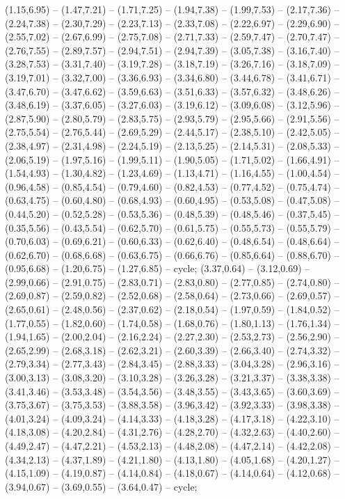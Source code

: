 { (1.15,6.95) -- (1.47,7.21) -- (1.71,7.25) -- (1.94,7.38) -- (1.99,7.53) -- (2.17,7.36) -- (2.24,7.38) -- (2.30,7.29) -- (2.23,7.13) -- (2.33,7.08) -- (2.22,6.97) -- (2.29,6.90) -- (2.55,7.02) -- (2.67,6.99) -- (2.75,7.08) -- (2.71,7.33) -- (2.59,7.47) -- (2.70,7.47) -- (2.76,7.55) -- (2.89,7.57) -- (2.94,7.51) -- (2.94,7.39) -- (3.05,7.38) -- (3.16,7.40) -- (3.28,7.53) -- (3.31,7.40) -- (3.19,7.28) -- (3.18,7.19) -- (3.26,7.16) -- (3.18,7.09) -- (3.19,7.01) -- (3.32,7.00) -- (3.36,6.93) -- (3.34,6.80) -- (3.44,6.78) -- (3.41,6.71) -- (3.47,6.70) -- (3.47,6.62) -- (3.59,6.63) -- (3.51,6.33) -- (3.57,6.32) -- (3.48,6.26) -- (3.48,6.19) -- (3.37,6.05) -- (3.27,6.03) -- (3.19,6.12) -- (3.09,6.08) -- (3.12,5.96) -- (2.87,5.90) -- (2.80,5.79) -- (2.83,5.75) -- (2.93,5.79) -- (2.95,5.66) -- (2.91,5.56) -- (2.75,5.54) -- (2.76,5.44) -- (2.69,5.29) -- (2.44,5.17) -- (2.38,5.10) -- (2.42,5.05) -- (2.38,4.97) -- (2.31,4.98) -- (2.24,5.19) -- (2.13,5.25) -- (2.14,5.31) -- (2.08,5.33) -- (2.06,5.19) -- (1.97,5.16) -- (1.99,5.11) -- (1.90,5.05) -- (1.71,5.02) -- (1.66,4.91) -- (1.54,4.93) -- (1.30,4.82) -- (1.23,4.69) -- (1.13,4.71) -- (1.16,4.55) -- (1.00,4.54) -- (0.96,4.58) -- (0.85,4.54) -- (0.79,4.60) -- (0.82,4.53) -- (0.77,4.52) -- (0.75,4.74) -- (0.63,4.75) -- (0.60,4.80) -- (0.68,4.93) -- (0.60,4.95) -- (0.53,5.08) -- (0.47,5.08) -- (0.44,5.20) -- (0.52,5.28) -- (0.53,5.36) -- (0.48,5.39) -- (0.48,5.46) -- (0.37,5.45) -- (0.35,5.56) -- (0.43,5.54) -- (0.62,5.70) -- (0.61,5.75) -- (0.55,5.73) -- (0.55,5.79) -- (0.70,6.03) -- (0.69,6.21) -- (0.60,6.33) -- (0.62,6.40) -- (0.48,6.54) -- (0.48,6.64) -- (0.62,6.70) -- (0.68,6.68) -- (0.63,6.75) -- (0.66,6.76) -- (0.85,6.64) -- (0.88,6.70) -- (0.95,6.68) -- (1.20,6.75) -- (1.27,6.85) -- cycle;
 (3.37,0.64) -- (3.12,0.69) -- (2.99,0.66) -- (2.91,0.75) -- (2.83,0.71) -- (2.83,0.80) -- (2.77,0.85) -- (2.74,0.80) -- (2.69,0.87) -- (2.59,0.82) -- (2.52,0.68) -- (2.58,0.64) -- (2.73,0.66) -- (2.69,0.57) -- (2.65,0.61) -- (2.48,0.56) -- (2.37,0.62) -- (2.18,0.54) -- (1.97,0.59) -- (1.84,0.52) -- (1.77,0.55) -- (1.82,0.60) -- (1.74,0.58) -- (1.68,0.76) -- (1.80,1.13) -- (1.76,1.34) -- (1.94,1.65) -- (2.00,2.04) -- (2.16,2.24) -- (2.27,2.30) -- (2.53,2.73) -- (2.56,2.90) -- (2.65,2.99) -- (2.68,3.18) -- (2.62,3.21) -- (2.60,3.39) -- (2.66,3.40) -- (2.74,3.32) -- (2.79,3.34) -- (2.77,3.43) -- (2.84,3.45) -- (2.88,3.33) -- (3.04,3.28) -- (2.96,3.16) -- (3.00,3.13) -- (3.08,3.20) -- (3.10,3.28) -- (3.26,3.28) -- (3.21,3.37) -- (3.38,3.38) -- (3.41,3.46) -- (3.53,3.48) -- (3.54,3.56) -- (3.48,3.55) -- (3.43,3.65) -- (3.60,3.69) -- (3.75,3.67) -- (3.75,3.53) -- (3.88,3.58) -- (3.96,3.42) -- (3.92,3.33) -- (3.98,3.38) -- (4.01,3.24) -- (4.09,3.24) -- (4.14,3.33) -- (4.18,3.28) -- (4.17,3.18) -- (4.22,3.10) -- (4.18,3.08) -- (4.20,2.84) -- (4.31,2.76) -- (4.28,2.70) -- (4.32,2.63) -- (4.40,2.60) -- (4.49,2.47) -- (4.47,2.21) -- (4.53,2.13) -- (4.48,2.08) -- (4.47,2.14) -- (4.42,2.08) -- (4.34,2.13) -- (4.37,1.89) -- (4.21,1.80) -- (4.13,1.80) -- (4.05,1.68) -- (4.20,1.27) -- (4.15,1.09) -- (4.19,0.87) -- (4.14,0.84) -- (4.18,0.67) -- (4.14,0.64) -- (4.12,0.68) -- (3.94,0.67) -- (3.69,0.55) -- (3.64,0.47) -- cycle;
}
